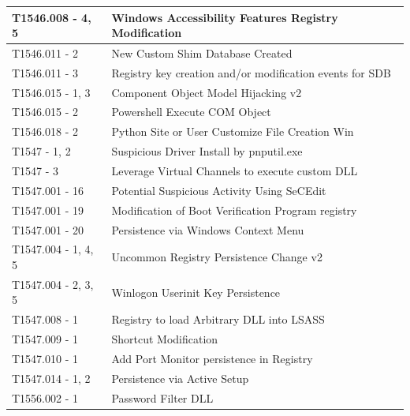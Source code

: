 \begin{longtable}{|>{\raggedright\arraybackslash}p{5.2cm}|>{\raggedright\arraybackslash}p{9.0cm}|}
T1546.008 - 4, 5 & Windows Accessibility Features Registry Modification \\ \hline
T1546.011 - 2 & New Custom Shim Database Created \\ \hline
T1546.011 - 3 & Registry key creation and/or modification events for SDB \\ \hline
T1546.015 - 1, 3 & Component Object Model Hijacking v2 \\ \hline
T1546.015 - 2 & Powershell Execute COM Object \\ \hline
T1546.018 - 2 & Python Site or User Customize File Creation Win \\ \hline
T1547 - 1, 2 & Suspicious Driver Install by pnputil.exe \\ \hline
T1547 - 3 & Leverage Virtual Channels to execute custom DLL \\ \hline
T1547.001 - 16 & Potential Suspicious Activity Using SeCEdit \\ \hline
T1547.001 - 19 & Modification of Boot Verification Program registry \\ \hline
T1547.001 - 20 & Persistence via Windows Context Menu \\ \hline
T1547.004 - 1, 4, 5 & Uncommon Registry Persistence Change v2 \\ \hline
T1547.004 - 2, 3, 5 & Winlogon Userinit Key Persistence \\ \hline
T1547.008 - 1 & Registry to load Arbitrary DLL into LSASS \\ \hline
T1547.009 - 1 & Shortcut Modification \\ \hline
T1547.010 - 1 & Add Port Monitor persistence in Registry \\ \hline
T1547.014 - 1, 2 & Persistence via Active Setup \\ \hline
T1556.002 - 1 & Password Filter DLL \\ \hline
\end{longtable}
\endgroup
